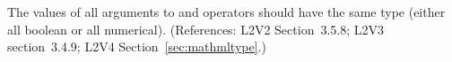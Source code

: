 The values of all arguments to  and  operators should
have the same type (either all boolean or all numerical).
(References: L2V2 Section~3.5.8; L2V3 section~3.4.9; L2V4
Section~\ref{sec:mathmltype}.)
